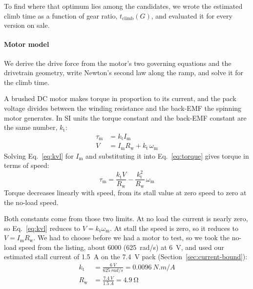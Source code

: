 To find where that optimum lies among the candidates, we wrote the estimated climb time as a function of gear ratio, $t_\mathrm{climb}(G)$, and evaluated it for every version on sale.

\paragraph{Motor model}
We derive the drive force from the motor's two governing equations and the drivetrain geometry, write Newton's second law along the ramp, and solve it for the climb time.

A brushed DC motor makes torque in proportion to its current, and the pack voltage divides between the winding resistance and the back-EMF the spinning motor generates. In SI units the torque constant and the back-EMF constant are the same number, $k_\mathrm{t}$:
\begin{align}
  \tau_\mathrm{m} &= k_\mathrm{t} I_\mathrm{m} \label{eq:torque} \\
  V &= I_\mathrm{m} R_\mathrm{w} + k_\mathrm{t}\, \omega_\mathrm{m} \label{eq:kvl}
\end{align}
Solving Eq.~\eqref{eq:kvl} for $I_\mathrm{m}$ and substituting it into Eq.~\eqref{eq:torque} gives torque in terms of speed:
\begin{equation}
  \tau_\mathrm{m} = \frac{k_\mathrm{t} V}{R_\mathrm{w}} - \frac{k_\mathrm{t}^2}{R_\mathrm{w}}\, \omega_\mathrm{m}
  \label{eq:tau-omega}
\end{equation}
Torque decreases linearly with speed, from its stall value at zero speed to zero at the no-load speed.

Both constants come from those two limits. At no load the current is nearly zero, so Eq.~\eqref{eq:kvl} reduces to $V = k_\mathrm{t}\omega_\mathrm{m}$. At stall the speed is zero, so it reduces to $V = I_\mathrm{m} R_\mathrm{w}$. We had to choose before we had a motor to test, so we took the no-load speed from the listing, about \qty{6000}{\rpm} (\qty{625}{rad/s}) at \qty{6}{V}, and used our estimated stall current of \qty{1.5}{A} on the \qty{7.4}{V} pack (Section~\ref{sec:current-bound}):
\begin{align}
  k_\mathrm{t} &= \frac{\qty{6}{V}}{\qty{625}{rad/s}} = \qty{0.0096}{N.m/A} \label{eq:k} \\
  R_\mathrm{w} &= \frac{\qty{7.4}{V}}{\qty{1.5}{A}} = \qty{4.9}{\ohm} \label{eq:R}
\end{align}

